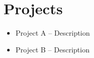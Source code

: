 \documentclass[10pt]{article}
\begin{document}
\\
\vspace{2mm}
\section*{Projects}
\begin{itemize}[leftmargin=*]
  \item Project A -- Description
  \item Project B -- Description
\end{itemize}
\end{document}
